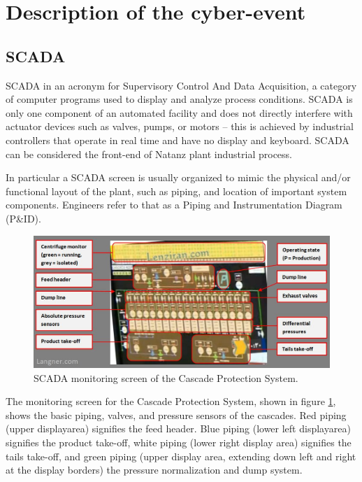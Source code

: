 \documentclass[12pt]{article}
\begin{document}
\section{Description of the cyber-event}

\subsection{SCADA}
SCADA in an acronym for Supervisory Control And Data Acquisition, a category of computer programs used to display and analyze process conditions. SCADA is only one component of an automated facility and does not directly interfere with actuator devices such as valves, pumps, or motors – this is achieved by industrial controllers that operate in real time and have no display and keyboard. SCADA can be considered the front-end of Natanz plant industrial process.

In particular a SCADA screen is usually organized to mimic the physical and/or functional layout of the plant, such as piping, and location of important system components. Engineers refer to that as a Piping and Instrumentation Diagram (P\&ID).
    
    \begin{figure}[H]
    \centering
    \includegraphics[height=0.45\textwidth]{scadaS.png}
    \caption{SCADA monitoring screen of the Cascade Protection System.}
    \label{fig:scadaS}
    \end{figure}

The monitoring screen for the Cascade Protection System, shown in figure \ref{fig:scadaS}, shows the basic piping, valves, and pressure sensors of the cascades. Red piping (upper displayarea) signifies the feed header. Blue piping (lower left displayarea) signifies the product take-off, white piping (lower right display area) signifies the tails take-off, and green piping (upper display area, extending down left and right at the display borders) the pressure normalization and dump system.
\end{document}
